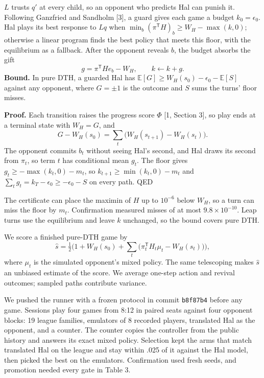 \documentclass[10pt]{article}
\newcommand{\head}[1]{\par\vspace{5pt}{\fontsize{11}{12}\selectfont\bfseries #1}\par\vspace{2pt}}
\begin{document}
\begin{minipage}[t]{0.55\textwidth}
\vspace{0pt}
\head{5. A guard on realized gifts}
$L$ trusts $q'$ at every child, so an opponent who predicts Hal can
punish it. Following Ganzfried and Sandholm [3], a guard gives each game
a budget $k_0=\epsilon_0$. Hal plays its best response to $Lq$ when
$\min_b(\pi^{\mathsf T}H)_b\ge W_H-\max(k,0)$; otherwise a linear program
finds the best policy that meets this floor, with the equilibrium as a
fallback. After the opponent reveals $b$, the budget absorbs the gift
\[
g=\pi^{\mathsf T}He_b-W_H,\qquad k\leftarrow k+g.
\]
\textbf{Bound.} In pure DTH, a guarded Hal has
$\mathbb E[G]\ge W_H(s_0)-\epsilon_0-\mathbb E[S]$ against any opponent,
where $G=\pm1$ is the outcome and $S$ sums the turns' floor misses.

\textbf{Proof.} Each transition raises the progress score $\Phi$
[1, Section 3], so play ends at a terminal state with $W_H=G$, and
\[
G-W_H(s_0)=\textstyle\sum_t\big(W_H(s_{t+1})-W_H(s_t)\big).
\]
The opponent commits $b_t$ without seeing Hal's second, and Hal draws its
second from $\pi_t$, so term $t$ has conditional mean $g_t$. The floor
gives $g_t\ge-\max(k_t,0)-m_t$, so $k_{t+1}\ge\min(k_t,0)-m_t$ and
$\sum_tg_t=k_T-\epsilon_0\ge-\epsilon_0-S$ on every path. \textup{QED}

The certificate can place the maximin of $H$ up to $10^{-6}$ below $W_H$,
so a turn can miss the floor by $m_t$. Confirmation measured misses of
at most $9.8\times10^{-10}$. Leap turns use the equilibrium and leave $k$
unchanged, so the bound covers pure DTH.

\head{6. A registered test}
We score a finished pure-DTH game by
\[
\hat s=\tfrac12\Big(1+W_H(s_0)+\textstyle\sum_t\big(\pi_t^{\mathsf T}H_t\mu_t-W_H(s_t)\big)\Big),
\]
where $\mu_t$ is the simulated opponent's mixed policy. The same
telescoping makes $\hat s$ an unbiased estimate of the score. We average
one-step action and revival outcomes; sampled paths contribute variance.

We pushed the runner with a frozen protocol in commit \texttt{b8f87b4}
before any game. Sessions play four games from 8:12 in paired seats
against four opponent blocks: 19 league families, emulators of 8
recorded players, translated Hal as the opponent, and a counter. The
counter copies the controller from the public history and answers its
exact mixed policy. Selection kept the arms that match translated Hal on
the league and stay within .025 of it against the Hal model, then picked
the best on the emulators. Confirmation used fresh seeds, and promotion
needed every gate in Table 3.
\end{minipage}\hfill
\end{document}
